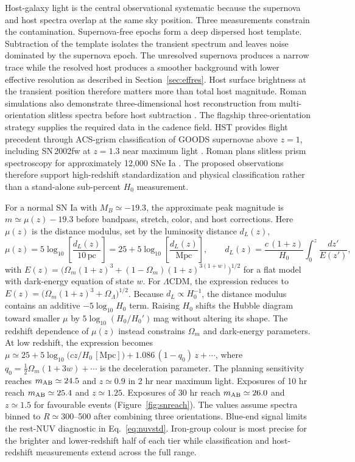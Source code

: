 Host-galaxy light is the central observational systematic because the supernova and host spectra overlap at the same sky position. Three measurements constrain the contamination. Supernova-free epochs form a deep dispersed host template. Subtraction of the template isolates the transient spectrum and leaves noise dominated by the supernova epoch. The unresolved supernova produces a narrow trace while the resolved host produces a smoother background with lower effective resolution as described in Section~\ref{sec:effres}. Host surface brightness at the transient position therefore matters more than total host magnitude. Roman simulations also demonstrate three-dimensional host reconstruction from multi-orientation slitless spectra before host subtraction \cite{astraatmadja2026}. The flagship three-orientation strategy supplies the required data in the cadence field. HST provides flight precedent through ACS-grism classification of GOODS supernovae above $z=1$, including SN\,2002fw at $z=1.3$ near maximum light \cite{riess2004}. Roman plans slitless prism spectroscopy for approximately 12{,}000 SNe Ia \cite{rose2021roman}. The proposed observations therefore support high-redshift standardization and physical classification rather than a stand-alone sub-percent $H_0$ measurement.

For a normal SN Ia with $M_B\simeq-19.3$, the approximate peak magnitude is $m\simeq\mu(z)-19.3$ before bandpass, stretch, color, and host corrections. Here $\mu(z)$ is the distance modulus, set by the luminosity distance $d_L(z)$,
\begin{equation}
\mu(z)=5\log_{10}\!\left[\frac{d_L(z)}{10\,\mathrm{pc}}\right]=25+5\log_{10}\!\left[\frac{d_L(z)}{\mathrm{Mpc}}\right],
\qquad
d_L(z)=\frac{c\,(1+z)}{H_0}\int_0^z\frac{dz'}{E(z')},
\label{eq:distmod}
\end{equation}
with $E(z)=\big(\Omega_m(1+z)^3+(1-\Omega_m)(1+z)^{3(1+w)}\big)^{1/2}$ for a flat model with dark-energy equation of state $w$. For $\Lambda$CDM, the expression reduces to $E(z)=\big(\Omega_m(1+z)^3+\Omega_\Lambda\big)^{1/2}$. Because $d_L\propto H_0^{-1}$, the distance modulus contains an additive $-5\log_{10}H_0$ term. Raising $H_0$ shifts the Hubble diagram toward smaller $\mu$ by $5\log_{10}(H_0/H_0')$\,mag without altering its shape. The redshift dependence of $\mu(z)$ instead constrains $\Omega_m$ and dark-energy parameters. At low redshift, the expression becomes $\mu\simeq25+5\log_{10}\!\big(cz/H_0\,[\mathrm{Mpc}]\big)+1.086\,(1-q_0)\,z+\cdots$, where $q_0=\tfrac12\Omega_m(1+3w)+\cdots$ is the deceleration parameter. The planning sensitivity reaches $m_{\rm AB}\simeq24.5$ and $z\simeq0.9$ in 2 hr near maximum light. Exposures of 10 hr reach $m_{\rm AB}\simeq25.4$ and $z\simeq1.25$. Exposures of 30 hr reach $m_{\rm AB}\simeq26.0$ and $z\simeq1.5$ for favourable events (Figure~\ref{fig:snreach}). The values assume spectra binned to $R\simeq300$--500 after combining three orientations. Blue-end signal limits the rest-NUV diagnostic in Eq.~\eqref{eq:nuvstd}. Iron-group colour is most precise for the brighter and lower-redshift half of each tier while classification and host-redshift measurements extend across the full range.

